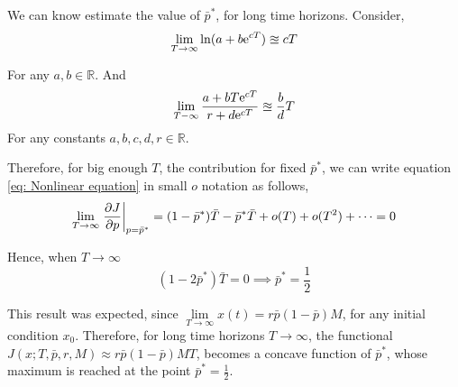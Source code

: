 We can know estimate the value of $\bar{p}^*$, for long time horizons. Consider,  
\begin{equation}	
\lim\limits_{T\rightarrow \infty} \ln(a+b\mathrm{e}^{cT})\approxeq cT
\end{equation}

For any $a,b \in \mathbb{R}$. And
\begin{equation}
	\lim\limits_{T-\infty}\frac{a+bT\mathrm{e}^{cT}}{r+d\mathrm{e}^{cT}} \approxeq \frac{b}{d}T
\end{equation}
For any constants $a,b,c,d,r \in \mathbb{R}$. 

Therefore, for big enough $T$, the contribution for fixed $\bar{p}^*$, we can write equation \ref{eq: Nonlinear equation} in small $o$ notation as follows,
\begin{equation}
\lim\limits_{T\rightarrow \infty}\left.\frac{\partial J}{{\partial p}}\right|_{p=\bar{p}^*} =(1-\bar{p}^*)\bar{T}-\bar{p}^*\bar{T}+o(T)+o(T^2)+\dots=0 
\end{equation}

Hence, when $T\rightarrow \infty$
\begin{equation}
	(1-2\bar{p}^*)\bar{T}=0\implies \bar{p}^*=\frac{1}{2}
\end{equation}

This result was expected, since 
$\lim\limits_{T\rightarrow\infty} x(t) = r\bar{p}(1-\bar{p})M$, for any initial condition $x_0$. Therefore, for long time horizons $T\rightarrow \infty$, the functional $J(x; T,\bar{p},r,M)\approx r\bar{p}(1-\bar{p})MT$, becomes a concave function of $\bar{p}^*$, whose maximum is reached at the point $\bar{p}^*=\frac{1}{2}$.